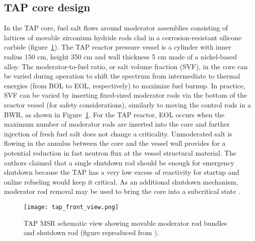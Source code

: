 \subsection{TAP core design}
In the \gls{TAP} core, fuel salt flows around moderator assemblies consisting 
of lattices of 
movable zirconium hydride rods clad in a corrosion-resistant silicone carbide 
(figure~\ref{fig:tap-main-view}). The \gls{TAP} reactor pressure vessel is a 
cylinder with inner radius 150 cm, height 350 cm and wall thickness 5 cm made 
of a nickel-based alloy. The moderator-to-fuel ratio, or salt volume fraction 
(SVF), in the core can be varied during operation to 
shift the spectrum from intermediate to thermal energies (from \gls{BOL} to 
\gls{EOL}, respectively) to maximize fuel burnup. In practice, SVF can be 
varied by inserting fixed-sized moderator rods via the bottom of the reactor 
vessel (for safety considerations), similarly to moving the control rods in 
a \gls{BWR}, as shown in Figure~\ref{fig:tap-main-view}. For the \gls{TAP} 
reactor, \gls{EOL} occurs when the maximum number of moderator rods are 
inserted into the core and further injection of fresh fuel salt does not 
change a criticality. Unmoderated salt is flowing in the annulus 
between the core and the vessel wall provides for a potential reduction in 
fast neutron flux at the vessel structural material. The authors claimed that a 
single shutdown rod should be enough for emergency shutdown because 
the \gls{TAP} has a very low excess of reactivity for startup and online 
refueling would keep it critical. As an additional shutdown mechanism, 
moderator rod removal may be used to bring the core into a subcritical state 
\cite{transatomic_power_corporation_neutronics_2016}.
\begin{figure}[htp!] %
  \centering
  		\hspace{+1.5in}
		  \texttt{[image: tap\_front\_view.png]}
  \caption{\gls{TAP} \gls{MSR} schematic view showing movable moderator rod 
  bundles and shutdown rod (figure reproduced from 
  \cite{transatomic_power_corporation_technical_2016}).}
  \label{fig:tap-main-view}
\end{figure}

